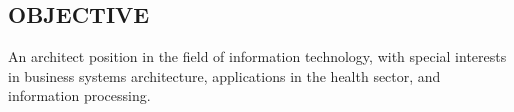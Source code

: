 \documentclass[line,margin]{res}
\begin{document}
 

\vspace{10mm}

\address{350 Pierce Street, San Francisco, CA}
\address{cell: (415) 967-1235 email: degibb@gmail.com}

 
\begin{resume}
\section{OBJECTIVE}       An architect position in the field of information technology, with special 
                interests in business systems architecture, applications in the health sector, and
                information processing.  
 



\end{resume}
\end{document}
